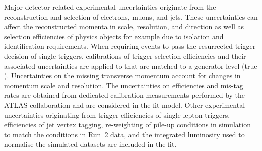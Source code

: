 Major detector-related experimental uncertainties originate from the
reconstruction and selection of electrons, muons, \tauhadvis and jets.
These uncertainties can affect the reconstructed momenta in scale,
resolution, and direction as well as selection efficiencies of physics
objects for example due to isolation and identification
requirements. When requiring events to pass the resurrected trigger
decision of single-\tauhadvis triggers, calibrations of trigger
selection efficiencies and their associated uncertainties are applied
to \tauhadvis that are matched to a generator-level \tauhad (true
\tauhadvis). Uncertainties on the missing transverse momentum account
for changes in momentum scale and resolution. The uncertainties on
\btag efficiencies and mis-tag rates are obtained from dedicated
calibration measurements performed by the ATLAS collaboration and are
considered in the fit model. Other experimental uncertainties
originating from trigger efficiencies of single lepton triggers,
efficiencies of jet vertex tagging, re-weighting of pile-up conditions
in simulation to match the conditions in Run~2 data, and the
integrated luminosity used to normalise the simulated datasets are
included in the fit.

